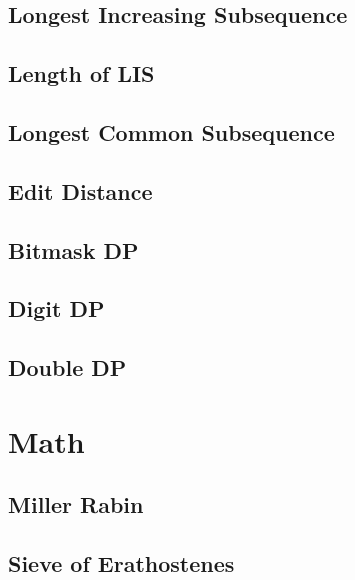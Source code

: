 \documentclass[10pt]{article}
\begin{document}
\begin{multicols*}{2}
\subsection{Longest Increasing Subsequence}


\subsection{Length of LIS}


\subsection{Longest Common Subsequence}


\subsection{Edit Distance}


\subsection{Bitmask DP}


\subsection{Digit DP}


\subsection{Double DP}


\section{Math}

\subsection{Miller Rabin }


\subsection{Sieve of Erathostenes}



\end{multicols*}
\end{document}
